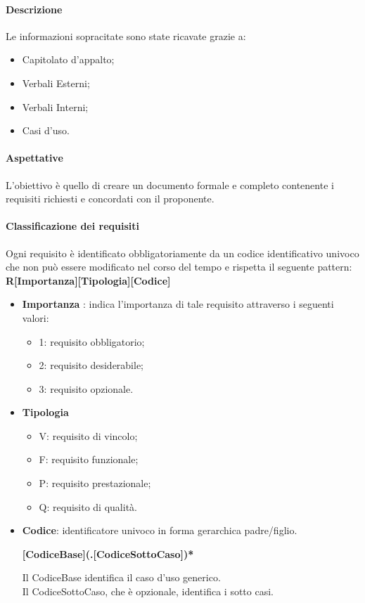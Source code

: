 \paragraph{Descrizione}
Le informazioni sopracitate sono state ricavate grazie a:
\begin{itemize}
  \item Capitolato d'appalto;
  \item Verbali Esterni;
  \item Verbali Interni;
  \item Casi d'uso.
\end{itemize}

\paragraph{Aspettative}
L'obiettivo è quello di creare un documento formale e completo contenente i requisiti richiesti e concordati con il proponente.

\paragraph{Classificazione dei requisiti} \label{_classificazioneRequisiti}
Ogni requisito è identificato obbligatoriamente da un codice identificativo univoco che non può essere modificato nel corso del tempo e rispetta il seguente pattern: \\
\textbf{R[Importanza][Tipologia][Codice]}

\begin{itemize}
  \item 	\textbf{Importanza} : indica l'importanza di tale requisito attraverso i seguenti valori:
        \begin{itemize}
          \item 1: requisito obbligatorio;
          \item 2: requisito desiderabile;
          \item 3: requisito opzionale.
        \end{itemize}
  \item \textbf{Tipologia}
        \begin{itemize}
          \item V: requisito di vincolo;
          \item F: requisito funzionale;
          \item P: requisito prestazionale;
          \item Q: requisito di qualità.
        \end{itemize}
  \item \textbf{Codice}: identificatore univoco in forma gerarchica padre/figlio. 
  	\begin{center}
  	 \textbf{[CodiceBase](.[CodiceSottoCaso])*} \\
  	\end{center}
       

        Il CodiceBase identifica il caso d'uso generico. \\
        Il CodiceSottoCaso, che è opzionale, identifica i sotto casi.
\end{itemize}


